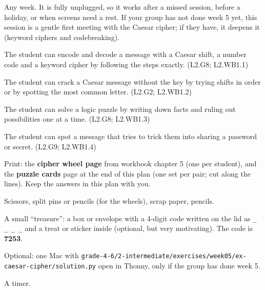 
\begin{teachernote}
Any week. It is fully unplugged, so it works after a missed session, before a holiday, or when screens need a rest.
If your group has not done week 5 yet, this session is a gentle first meeting with the Caesar cipher; if they have, it deepens it
(keyword ciphers and codebreaking).
\end{teachernote}

\begin{objectives}
  \item The student can encode and decode a message with a Caesar shift, a number code and a keyword cipher by following the steps exactly. (L2.G8; L2.WB1.1)
  \item The student can crack a Caesar message without the key by trying shifts in order or by spotting the most common letter. (L2.G2; L2.WB1.2)
  \item The student can solve a logic puzzle by writing down facts and ruling out possibilities one at a time. (L2.G8; L2.WB1.3)
  \item The student can spot a message that tries to trick them into sharing a password or secret. (L2.G9; L2.WB1.4)
\end{objectives}

\begin{materials}
  \item Print: the \textbf{cipher wheel page} from workbook chapter 5 (one per student), and the \textbf{puzzle cards} page at the end of this plan
        (one set per pair; cut along the lines). Keep the answers in this plan with you.
  \item Scissors, split pins or pencils (for the wheels), scrap paper, pencils.
  \item A small \enquote{treasure}: a box or envelope with a 4-digit code written on the lid as \texttt{\_ \_ \_ \_} and a treat or sticker inside
        (optional, but very motivating). The code is \textbf{7253}.
  \item Optional: one Mac with \texttt{grade-4-6/2-intermediate/exercises/week05/ex-caesar-cipher/solution.py} open in Thonny, only if the group has done week 5.
  \item A timer.
\end{materials}

